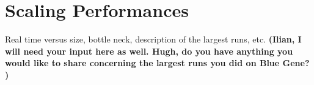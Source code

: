 \section{Scaling Performances}

Real time versus size, bottle neck, description of the largest runs, etc.
{\bf (Ilian, I will need your input here as well. Hugh, do you have anything you would like to share 
concerning the largest runs you did on Blue Gene? )} 

